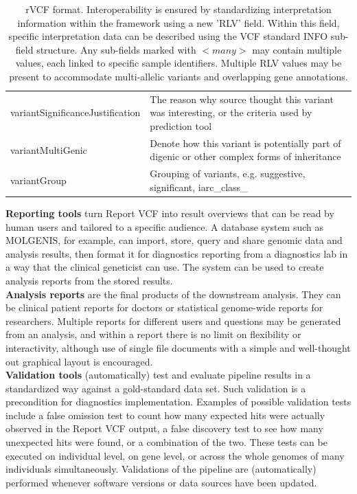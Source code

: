 \begin{table}
\begin{tabulary}{\linewidth}{LL}
  \rule{0pt}{2.5ex}variantSignificanceJustification & The reason why source thought this variant was interesting, or the criteria used by prediction tool \\
  \rule{0pt}{2.5ex}variantMultiGenic & Denote how this variant is potentially part of digenic or other complex forms of inheritance \\
  \rule{0pt}{2.5ex}variantGroup & Grouping of variants, e.g. suggestive, significant, iarc\_\-class\_ \\
  \hline
\end{tabulary}
\caption[rVCF format specification]{rVCF format. Interoperability is ensured by standardizing interpretation information within the framework using a new 'RLV' field. Within this field, specific interpretation data can be described using the VCF standard INFO sub-field structure. Any sub-fields marked with $<many>$ may contain multiple values, each linked to specific sample identifiers. Multiple RLV values may be present to accommodate multi-allelic variants and overlapping gene annotations.}
\label{table:frameworkforgenomics_rvcffields}
\end{table}

\noindent\textbf{Reporting tools} turn Report VCF into result overviews that can be read by human users and tailored to a specific audience.
A database system such as MOLGENIS, for example, can import, store, query and share genomic data and analysis results, then format it for diagnostics reporting from a diagnostics lab in a way that the clinical geneticist can use.
The system can be used to create analysis reports from the stored results.\\

\noindent\textbf{Analysis reports} are the final products of the downstream analysis.
They can be clinical patient reports for doctors or statistical genome-wide reports for researchers.
Multiple reports for different users and questions may be generated from an analysis, and within a report there is no limit on flexibility or interactivity, although use of single file documents with a simple and well-thought out graphical layout is encouraged.\\

\noindent\textbf{Validation tools} (automatically) test and evaluate pipeline results in a standardized way against a gold-standard data set.
Such validation is a precondition for diagnostics implementation.
Examples of possible validation tests include a false omission test to count how many expected hits were actually observed in the Report VCF output, a false discovery test to see how many unexpected hits were found, or a combination of the two.
These tests can be executed on individual level, on gene level, or across the whole genomes of many individuals simultaneously.
Validations of the pipeline are (automatically) performed whenever software versions or data sources have been updated.

